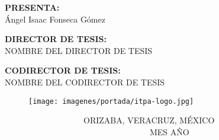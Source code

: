\begin{titlepage}
    \vspace{0.5\baselineskip}
    \begin{center}
        \fontsize{11}{12}\selectfont \textbf{PRESENTA:} \\
        \fontsize{12}{12}\selectfont Ángel Isaac Fonseca Gómez %
    \end{center}

    \vspace{1\baselineskip}
    \begin{center}
        \fontsize{11}{12}\selectfont \textbf{DIRECTOR DE TESIS:} \\
        \fontsize{12}{12}\selectfont NOMBRE DEL DIRECTOR DE TESIS %
    \end{center}

    \vspace{1\baselineskip}
    \begin{center}
        \fontsize{11}{12}\selectfont \textbf{CODIRECTOR DE TESIS:} \\
        \fontsize{12}{12}\selectfont NOMBRE DEL CODIRECTOR DE TESIS %
    \end{center}

    \begin{figure}[H]
        \texttt{[image: imagenes/portada/itpa-logo.jpg]}
    \end{figure}

    \vspace{1\baselineskip}
    \begin{flushleft}
        \fontsize{11}{12}\selectfont \ \ \ \ \ \ \ \ \ \ \ \ \ \ \ \ \ \ \ ORIZABA, VERACRUZ, MÉXICO \ \ \ \ \ \ \ \ \ \ \ \ \ \ \ \ \ \ \ \ \ \ \ \ \ \ \ \ \ \ \ \ \ \ \ MES AÑO %
    \end{flushleft}
\end{titlepage}

